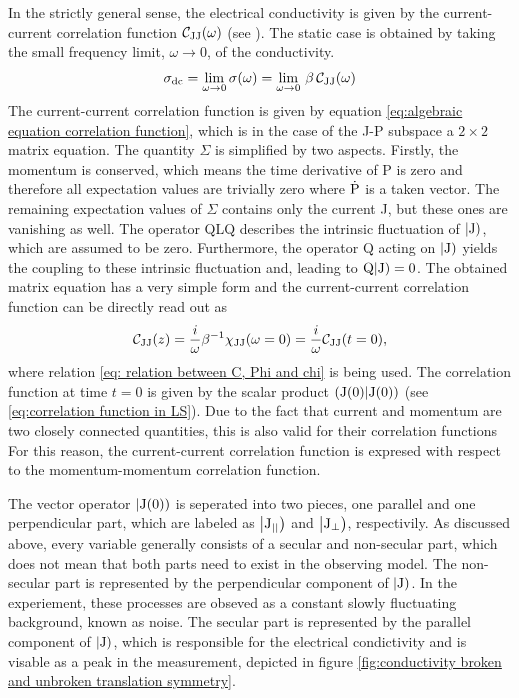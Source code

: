In the strictly general sense, the electrical conductivity is given by the current-current correlation function $\mathcal{C}_{\mathrm{JJ}}(\omega)$ (see \cite{Chycholl2}).
The static case is obtained by taking the small frequency limit, $\omega \to 0$, of the conductivity.
%
\begin{align}
	\sigma_{\mathrm{dc}} = \lim\limits_{\omega \to 0} \sigma(\omega) = \lim\limits_{\omega \to 0}\, \beta\,\mathcal{C}_{\mathrm{JJ}}(\omega)
	\label{eq:general static condictivity}
\end{align}
%
The current-current correlation function is given by equation \eqref{eq:algebraic equation correlation function}, which is in the case of the J-P subspace a $2\times2$ matrix equation.
The quantity $\Sigma$ is simplified by two aspects.
Firstly, the momentum is conserved, which means the time derivative of P is zero and therefore all expectation values are trivially zero where $\dot{\mathrm{P}}$ is a taken vector.
The remaining expectation values of $\Sigma$ contains only the current J, but these ones are vanishing as well.
The operator QLQ describes the intrinsic fluctuation of $|\mathrm{\mathrm{J}})$, which are assumed to be zero.
Furthermore, the operator Q acting on $|\mathrm{\mathrm{J}})$ yields the coupling to these intrinsic fluctuation and, leading to $\mathrm{Q}|\mathrm{\mathrm{J}}) = 0$.
The obtained matrix equation has a very simple form and the current-current correlation function can be directly read out as
%
\begin{align}
	\mathcal{C}_{\mathrm{JJ}}(z) = \frac{i}{\omega} \beta^{-1} \chi_{\mathrm{JJ}}(\omega=0) = \frac{i}{\omega} \mathcal{C}_{\mathrm{JJ}}(t=0),
	\label{eq:correlation function unpertubated system}
\end{align}
%
where relation \eqref{eq: relation between C, Phi and chi} is being used.
The correlation function at time $t = 0$ is given by the scalar product $({\mathrm{J}(0)}|{\mathrm{J}(0)})$ (see \eqref{eq:correlation function in LS}).
Due to the fact that current and momentum are two closely connected quantities, this is also valid for their correlation functions
For this reason, the current-current correlation function is expresed with respect to the momentum-momentum correlation function.

The vector operator $|\mathrm{\mathrm{J}(0)})$ is seperated into two pieces, one parallel and one perpendicular part, which are labeled as $\big|{\mathrm{J}_{\mid\mid}}\big)$ and $\big|{\mathrm{J}_{\bot}}\big)$, respectivily.
As discussed above, every variable generally consists of a secular and non-secular part, which does not mean that both parts need to exist in the observing model.
The non-secular part is represented by the perpendicular component of $|\mathrm{J})$.
In the experiement, these processes are obseved as a constant slowly fluctuating background, known as noise.
The secular part is represented by the parallel component of $|\mathrm{J})$, which is responsible for the electrical condictivity and is visable as a peak in the measurement, depicted in figure \ref{fig:conductivity broken and unbroken translation symmetry}.

